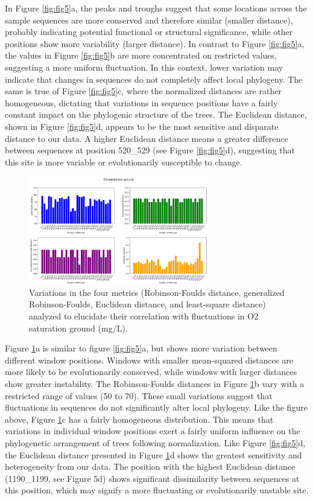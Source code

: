 In Figure \ref{fig:fig5}a, the peaks and troughs suggest that some locations across the sample sequences are more conserved and therefore similar (smaller distance), probably indicating potential functional or structural significance, while other positions show more variability (larger distance). In contrast to Figure \ref{fig:fig5}a, the values in Figure \ref{fig:fig5}b are more concentrated on restricted values, suggesting a more uniform fluctuation. In this context, lower variation may indicate that changes in sequences do not completely affect local phylogeny. The same is true of Figure \ref{fig:fig5}c, where the normalized distances are rather homogeneous, dictating that variations in sequence positions have a fairly constant impact on the phylogenic structure of the trees. The Euclidean distance, shown in Figure \ref{fig:fig5}d, appears to be the most sensitive and disparate distance to our data. A higher Euclidean distance means a greater difference between sequences at position 520_529 (see Figure \ref{fig:fig5}d), suggesting that this site is more variable or evolutionarily susceptible to change. 

\begin{figure}[]
    \centering
    \includegraphics[width=0.7\textwidth]{figure6.png}
    \caption{Variations in the four metrics (Robinson-Foulds distance, generalized Robinson-Foulds, Euclidean distance, and least-square distance) analyzed to elucidate their correlation with fluctuations in O2 saturation ground (mg/L). \label{fig:fig6}}
\end{figure}

Figure \ref{fig:fig6}a is similar to figure \ref{fig:fig5}a, but shows more variation between different window positions. Windows with smaller mean-squared distances are more likely to be evolutionarily conserved, while windows with larger distances show greater instability. The Robinson-Foulds distances in Figure \ref{fig:fig6}b vary with a restricted range of values (50 to 70). These small variations suggest that fluctuations in sequences do not significantly alter local phylogeny. Like the figure above, Figure \ref{fig:fig6}c has a fairly homogeneous distribution. This means that variations in individual window positions exert a fairly uniform influence on the phylogenetic arrangement of trees following normalization. Like Figure \ref{fig:fig5}d, the Euclidean distance presented in Figure \ref{fig:fig6}d shows the greatest sensitivity and heterogeneity from our data. The position with the highest Euclidean distance (1190_1199, see Figure 5d) shows significant dissimilarity between sequences at this position, which may signify a more fluctuating or evolutionarily unstable site. 


